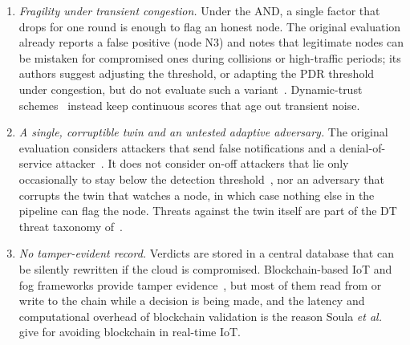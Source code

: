 \begin{enumerate}
\item \emph{Fragility under transient congestion.}  Under the AND, a
single factor that drops for one round is enough to flag an honest
node.  The original evaluation already reports a false positive
(node N3) and notes that legitimate nodes can be mistaken for
compromised ones during collisions or high-traffic periods; its
authors suggest adjusting the threshold, or adapting the PDR
threshold under congestion, but do not evaluate such a variant~\cite{soula2024iodt}.
Dynamic-trust schemes~\cite{bao2012dynamic,nitti2014trustworthiness}
instead keep continuous scores that age out transient noise.

\item \emph{A single, corruptible twin and an untested adaptive
adversary.}  The original evaluation considers attackers that send
false notifications and a denial-of-service attacker~\cite{soula2024iodt}.
It does not consider on-off attackers that lie only occasionally to
stay below the detection threshold~\cite{sun2006trust},
nor an adversary that corrupts the twin that watches a node, in which
case nothing else in the pipeline can flag the node.  Threats against
the twin itself are part of the DT threat taxonomy
of~\cite{alcaraz2022digital}.

\item \emph{No tamper-evident record.}  Verdicts are stored in a
central database that can be silently rewritten if the cloud is
compromised.  Blockchain-based IoT and fog frameworks provide tamper
evidence~\cite{dorri2017blockchain,novo2018blockchain,kumar2020blockedge,%
dewanta2021bpt,akram2024tmiodt}, but most of them read from or write
to the chain while a decision is being made, and the latency and
computational overhead of blockchain validation is the reason Soula
\textit{et al.}~\cite{soula2024iodt} give for avoiding blockchain in
real-time IoT.
\end{enumerate}

